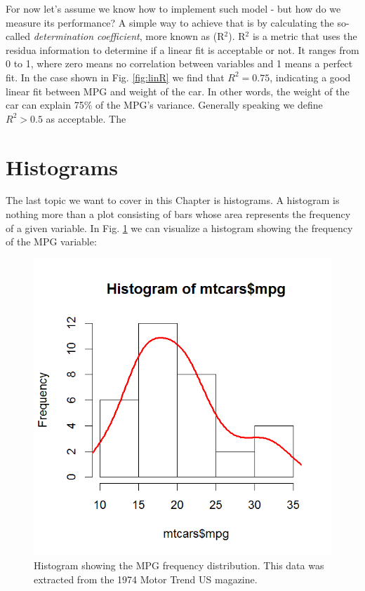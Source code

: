 \documentclass[10pt]{PhDthesisPSnPDF}%
\begin{document}
\newpage

For now let's assume we know how to implement such model - but how do we measure its performance? A simple way to achieve that is by calculating the so-called \textit{determination coefficient}, more known as (R$^2$). R$^2$ is a metric that uses the residua information to determine if a linear fit is acceptable or not. It ranges from 0 to 1, where zero means no correlation between variables and 1 means a perfect fit. In the case shown in Fig. \ref{fig:linR} we find that $R^2=0.75$, indicating a good linear fit between MPG and weight of the car. In other words, the weight of the car can explain 75$\%$ of the MPG's variance. Generally speaking we define $R^2>0.5$ as acceptable. The 

\section{Histograms}

The last topic we want to cover in this Chapter is histograms. A histogram is nothing more than a plot consisting of bars whose area represents the frequency of a given variable. In Fig. \ref{fig:histch2} we can visualize a histogram showing the frequency of the MPG variable:

\begin{figure}[h]
	\begin{center}
			\includegraphics[scale=0.7]{histch2}
	\end{center}
	\caption{Histogram showing the MPG frequency distribution. This data was extracted from the 1974 Motor Trend US magazine.}
	\label{fig:histch2}
\end{figure} 
\end{document}
